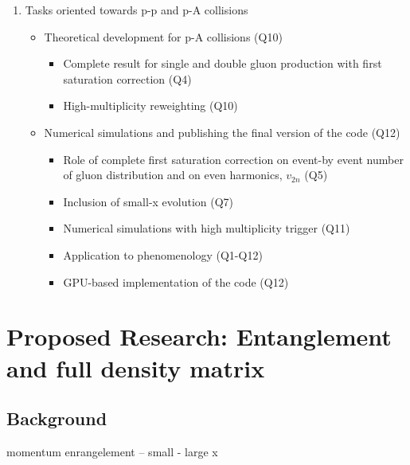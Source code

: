         \begin{enumerate}
            \item  Tasks oriented towards p-p 
				and  p-A  collisions  
                \begin{itemize}
                    \item Theoretical development for p-A collisions (Q10)
                        \begin{itemize}
                            \item Complete result for single and double 
								gluon production with first saturation 
								correction (Q4)
                            \item High-multiplicity reweighting  (Q10)
                        \end{itemize}
                    \item Numerical simulations and publishing the final version 
					of the 	code (Q12)
                        \begin{itemize}
                            \item Role of complete first saturation correction on 
								event-by event number of gluon distribution 
								and on even harmonics, $v_{2n}$ (Q5)
                            \item Inclusion of small-x evolution  (Q7)
                            \item Numerical simulations with
								high multiplicity trigger (Q11)
							\item Application to phenomenology (Q1-Q12)
							\item GPU-based implementation of the code (Q12) 
                        \end{itemize}
                \end{itemize}
        \end{enumerate}

\section{Proposed Research: Entanglement and full density matrix}
    \label{sec:p2}

    \vspace{0.5em}
    \subsection{Background}
    \label{sec:p2b}

momentum enrangelement -- small - large x 



